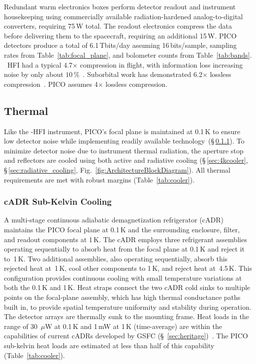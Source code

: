 Redundant warm electronics boxes perform detector readout and instrument housekeeping using commercially available radiation-hardened analog-to-digital converters, requiring 75\,W total. The readout electronics compress the data before delivering them to the spacecraft, requiring an additional 15\,W. PICO detectors produce a total of 6.1\,Tbits/day assuming 16\,bits/sample, sampling rates from Table~\ref{tab:focal_plane}, and bolometer counts from Table~\ref{tab:bands}. \planck \ HFI had a typical 4.7$\times$ compression in flight, with information loss increasing noise by only about $10\,\%$~\citep{Pajot2018,PlanckHFI2011}. Suborbital work has demonstrated 6.2$\times$ lossless compression~\citep{EBEX2017}. PICO assumes 4$\times$ lossless compression.

\medskip
\subsection{Thermal}
\label{sec:thermal} %

Like the \planck -HFI instrument, PICO's focal plane is maintained at 0.1\,K to ensure low detector noise while implementing readily available technology~(\S\,\ref{sec:cadr}). To minimize detector noise due to instrument thermal radiation, the aperture stop and reflectors are cooled using both active and radiative cooling (\S\,\ref{sec:4kcooler}, \S\,\ref{sec:radiative_cooling}, Fig.~\ref{fig:ArchitectureBlockDiagram}).  All thermal requirements are met with robust margins (Table~\ref{tab:cooler}).



\smallskip
\subsubsection{cADR Sub-Kelvin Cooling}
\label{sec:cadr} %

A multi-stage continuous adiabatic demagnetization refrigerator (cADR) maintains the PICO focal plane at 0.1\,K and the surrounding enclosure, filter, and readout components at 1\,K. The cADR employs three refrigerant assemblies operating sequentially to absorb heat from the focal plane at 0.1\,K and reject it to~1\,K. Two additional assemblies, also operating sequentially, absorb this rejected heat at~1\,K, cool other components to 1\,K, and reject heat at~4.5\,K. This configuration provides continuous cooling with small temperature variations at both the 0.1\,K and 1\,K. Heat straps connect the two cADR cold sinks to multiple points on the focal-plane assembly,
which has high thermal conductance paths built in, to provide spatial temperature uniformity and stability during operation. The detector arrays are thermally sunk to the mounting frame.  Heat loads in the range of 30~$\mu$W at 0.1\,K and 1\,mW at 1\,K (time-average) are within the capabilities of current cADRs developed by GSFC (\S~\ref{sec:heritage})~\citep{Shirron2012,Shirron2016}. The PICO sub-kelvin heat loads are estimated at less than half of this capability (Table~\ref{tab:cooler}).

